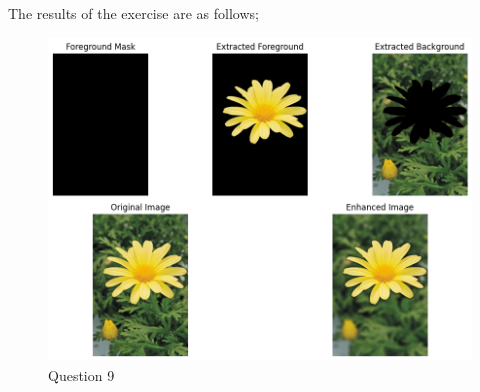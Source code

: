 \documentclass{article}[a4paper]
\begin{document}
\begin{enumerate}
The results of the exercise are as follows;
\begin{figure}
	\centering
	\includegraphics[width=0.9\linewidth]{images/q9.png}
	\caption{Question 9}
\end{figure}

\end{enumerate}
\end{document}
